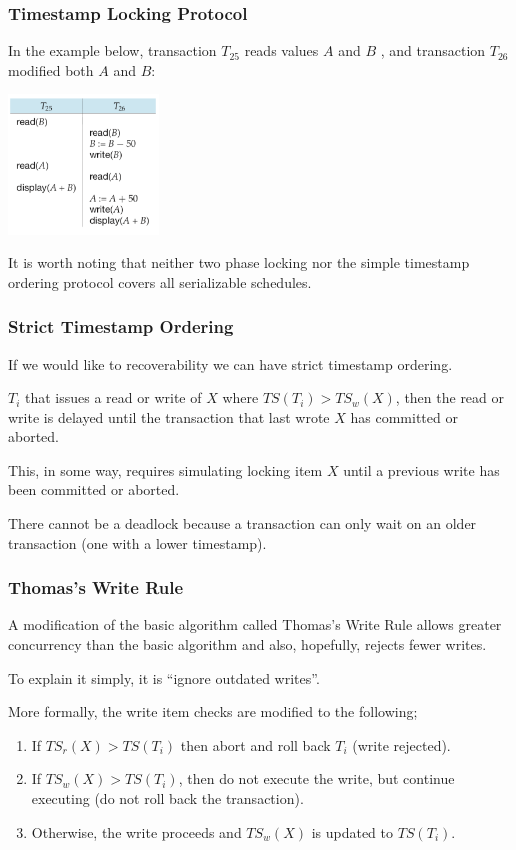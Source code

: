 \begin{frame}
\frametitle{Timestamp Locking Protocol}

In the example below, transaction $T_{25}$ reads values $A$ and $B$ , and transaction $T_{26}$ modified both $A$ and $B$:

\begin{center}
	\includegraphics[width=0.3\textwidth]{images/timestamp-schedule}
\end{center}

It is worth noting that neither two phase locking nor the simple timestamp ordering protocol covers all serializable schedules.


\end{frame}

\begin{frame}
\frametitle{Strict Timestamp Ordering}
If we would like to recoverability we can have strict timestamp ordering. 

$T_{i}$ that issues a read or write of $X$ where $T\!S(T_{i}) > T\!S_{w}(X)$, then the read or write is delayed until the transaction that last wrote $X$ has committed or aborted. 

This, in some way, requires simulating locking item $X$ until a previous write has been committed or aborted.

There cannot be a deadlock because a transaction can only wait on an older transaction (one with a lower timestamp).

\end{frame}

\begin{frame}
\frametitle{Thomas's Write Rule}
A modification of the basic algorithm called Thomas's Write Rule allows greater concurrency than the basic algorithm and also, hopefully, rejects fewer writes. 

To explain it simply, it is ``ignore outdated writes''.

More formally, the write item checks are modified to the following;
\begin{enumerate}
	\item If $T\!S_{r}(X) > T\!S(T_{i})$ then abort and roll back $T_{i}$ (write rejected).
	\item If $T\!S_{w}(X) > T\!S(T_{i})$, then do not execute the write, but continue executing (do not roll back the transaction).
	\item Otherwise, the write proceeds and $T\!S_{w}(X)$ is updated to $T\!S(T_{i})$. 
\end{enumerate}

\end{frame}

